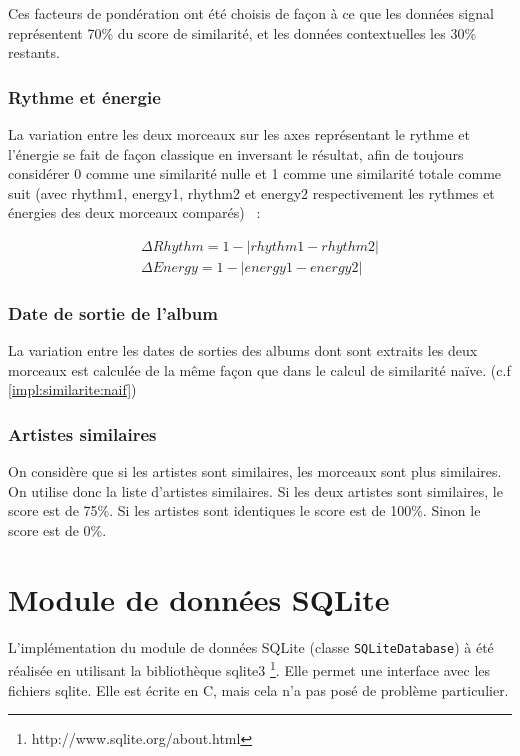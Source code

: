 Ces facteurs de pondération ont été choisis de façon à ce que les données
signal représentent 70\% du score de similarité, et les données contextuelles
les 30\% restants.

\subsubsection{Rythme et énergie}
\label{impl:similarite:complet:rhythm}

La variation entre les deux morceaux sur les axes représentant le rythme et
l'énergie se fait de façon classique en inversant le résultat, afin de toujours
considérer 0 comme une similarité nulle et 1 comme une similarité totale comme
suit (avec rhythm1, energy1, rhythm2 et energy2 respectivement les rythmes et
énergies des deux morceaux comparés) ~:

\begin{align}
  \Delta Rhythm = 1 - |rhythm1 - rhythm2|\\
  \Delta Energy = 1 - |energy1 - energy2|
\end{align}

\subsubsection{Date de sortie de l'album}
\label{impl:similarite:complet:date}

La variation entre les dates de sorties des albums dont sont extraits les deux
morceaux est calculée de la même façon que dans le calcul de similarité naïve.
(c.f \ref{impl:similarite:naif})

\subsubsection{Artistes similaires}
\label{impl:similarite:complet:artist}

On considère que si les artistes sont similaires, les morceaux sont plus
similaires. On utilise donc la liste d'artistes similaires. Si les deux artistes
sont similaires, le score est de 75\%. Si les artistes sont identiques le score
est de 100\%. Sinon le score est de 0\%.

\section{Module de données SQLite}
\label{implementation:sqlite}

L’implémentation du module de données SQLite (classe \texttt{SQLiteDatabase})
à été réalisée en utilisant la bibliothèque sqlite3
\footnote{http://www.sqlite.org/about.html}. Elle permet une interface avec les
fichiers sqlite. Elle est écrite en C, mais cela n'a pas posé de problème
particulier.


